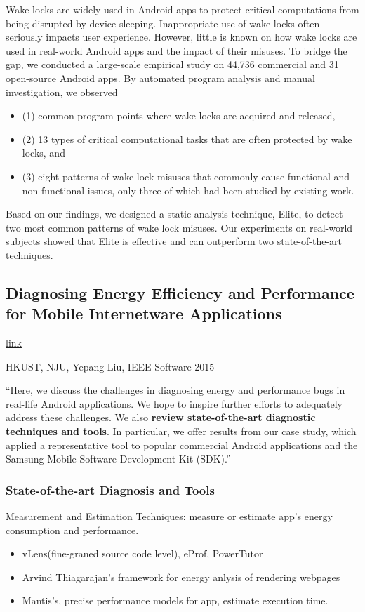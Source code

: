 Wake locks are widely used in Android apps to protect critical computations from
being disrupted by device sleeping. Inappropriate use of wake locks often
seriously impacts user experience. However, little is known on how wake locks
are used in real-world Android apps and the impact of their misuses. To bridge
the gap, we conducted a large-scale empirical study on 44,736 commercial and 31
open-source Android apps. By automated program analysis and manual
investigation, we observed
\begin{itemize}
\item (1) common program points where wake locks are acquired and released,
\item (2) 13 types of critical computational tasks that are often protected by
  wake locks, and
\item (3) eight patterns of wake lock misuses that commonly cause functional and
  non-functional issues, only three of which had been studied by existing work.
\end{itemize}
Based on our findings, we designed a static
analysis technique, Elite, to detect two most common patterns of wake lock
misuses. Our experiments on real-world subjects showed that Elite is effective
and can outperform two state-of-the-art techniques.


\subsection{Diagnosing Energy Efficiency and Performance for Mobile Internetware
  Applications}

\href{http://sccpu2.cse.ust.hk/andrewust/files/ieeesoft15.pdf}{link}

HKUST, NJU, Yepang Liu, IEEE Software 2015


``Here, we discuss the challenges in diagnosing energy and performance bugs in
real-life Android applications. We hope to inspire further efforts to adequately
address these challenges. We also \textbf{review state-of-the-art diagnostic
  techniques and tools}. In particular, we offer results from our case study,
which applied a representative tool to popular commercial Android applications
and the Samsung Mobile Software Development Kit (SDK).''

\subsubsection{State-of-the-art Diagnosis and Tools}
Measurement and Estimation Techniques: measure or estimate app's energy
consumption and performance.
\begin{itemize}
\item vLens(fine-graned source code level), eProf, PowerTutor
\item Arvind Thiagarajan's framework for energy anlysis of rendering webpages
\item Mantis's, precise performance models for app, estimate execution time.
\end{itemize}

